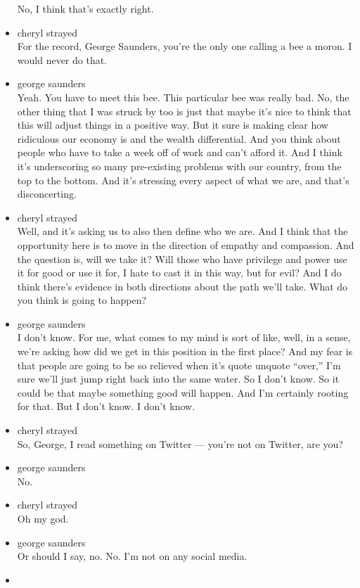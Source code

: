 \begin{itemize}
  No, I think that's exactly right.
\item
  cheryl strayed\\
  For the record, George Saunders, you're the only one calling a bee a
  moron. I would never do that.
\item
  george saunders\\
  Yeah. You have to meet this bee. This particular bee was really bad.
  No, the other thing that I was struck by too is just that maybe it's
  nice to think that this will adjust things in a positive way. But it
  sure is making clear how ridiculous our economy is and the wealth
  differential. And you think about people who have to take a week off
  of work and can't afford it. And I think it's underscoring so many
  pre-existing problems with our country, from the top to the bottom.
  And it's stressing every aspect of what we are, and that's
  disconcerting.
\item
  cheryl strayed\\
  Well, and it's asking us to also then define who we are. And I think
  that the opportunity here is to move in the direction of empathy and
  compassion. And the question is, will we take it? Will those who have
  privilege and power use it for good or use it for, I hate to cast it
  in this way, but for evil? And I do think there's evidence in both
  directions about the path we'll take. What do you think is going to
  happen?
\item
  george saunders\\
  I don't know. For me, what comes to my mind is sort of like, well, in
  a sense, we're asking how did we get in this position in the first
  place? And my fear is that people are going to be so relieved when
  it's quote unquote ``over,'' I'm sure we'll just jump right back into
  the same water. So I don't know. So it could be that maybe something
  good will happen. And I'm certainly rooting for that. But I don't
  know. I don't know.
\item
  cheryl strayed\\
  So, George, I read something on Twitter --- you're not on Twitter, are
  you?
\item
  george saunders\\
  No.
\item
  cheryl strayed\\
  Oh my god.
\item
  george saunders\\
  Or should I say, no. No. I'm not on any social media.
\item

\end{itemize}
